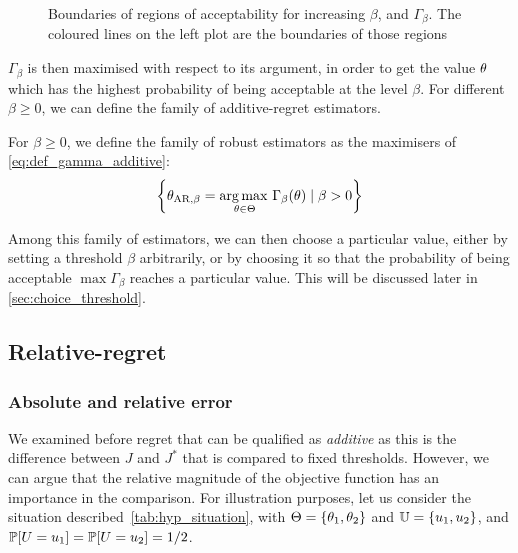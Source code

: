 \documentclass[../../Main_ManuscritThese.tex]{subfiles}
\newcommand\imgpath{/home/victor/acadwriting/Manuscrit/Text/Chapter3/img/}
\begin{document}
\begin{figure}[ht]
  \centering
  
  \caption[Regions of $\beta$-acceptability]{\label{fig:gamma_beta_increasing} Boundaries of regions of acceptability for increasing $\beta$, and $\Gamma_{\beta}$. The coloured lines on the left plot are the boundaries of those regions}
\end{figure}


$\Gamma_{\beta}$ is then maximised with respect to its argument, in
order to get the value $\theta$ which has the highest probability of
being acceptable at the level $\beta$. For different $\beta \geq 0$,
we can define the family of additive-regret estimators.

  
  \begin{definition}
    \label{def:AR_family}
    For $\beta \geq 0$, we define the family of robust estimators as
    the maximisers of \cref{eq:def_gamma_additive}:
    \begin{equation}
      \label{eq:def_AR_family}
      \left\{\estimtxt{\kk}{AR,\beta} = \argmax_{\kk\in\Kspace} \Gamma_{\beta}(\kk) \mid \beta > 0\right\} %
    \end{equation}
  \end{definition}
  Among this family of estimators, we can then choose a particular
  value, either by setting a threshold $\beta$ arbitrarily, or by
  choosing it so that the probability of being acceptable
  $\max \Gamma_{\beta}$ reaches a particular value. This will be
  discussed later in \cref{sec:choice_threshold}.


  \subsection{Relative-regret}
  \subsubsection{Absolute and relative error}
  \label{ssec:hyp_situation}
  We examined before regret that can be qualified as \emph{additive}
  as this is the difference between $J$ and $J^*$ that is compared to
  fixed thresholds.  However, we can argue that the relative magnitude
  of the objective function has an importance in the comparison. For
  illustration purposes, let us consider the situation
  described~\cref{tab:hyp_situation}, with
  $\Theta = \{\theta_1, \theta_2\}$ and $\mathbb{U} = \{u_1, u_2\}$, and
  $\mathbb{P}[U = u_1] =\mathbb{P}[U = u_2]= 1/2$.
\end{document}
